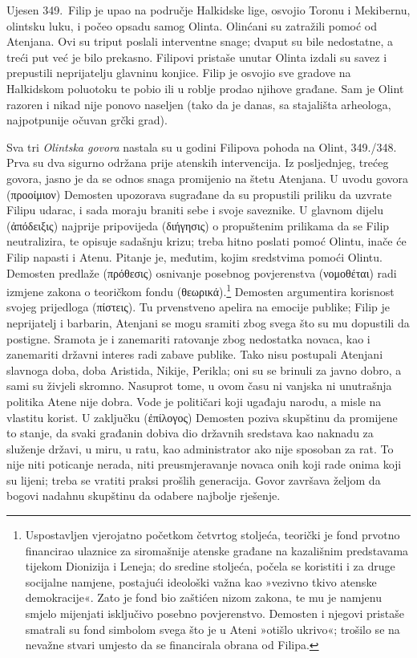 Ujesen 349.\ Filip je upao na područje Halkidske lige, osvojio Toronu i Mekibernu, olintsku luku, i počeo opsadu samog Olinta. Olinćani su zatražili pomoć od Atenjana. Ovi su triput poslali interventne snage; dvaput su bile nedostatne, a treći put već je bilo prekasno. Filipovi pristaše unutar Olinta izdali su savez i prepustili neprijatelju glavninu konjice. Filip je osvojio sve gradove na Halkidskom poluotoku te pobio ili u roblje prodao njihove građane. Sam je Olint razoren i nikad nije ponovo naseljen (tako da je danas, sa stajališta arheologa, najpotpunije očuvan grčki grad).

Sva tri \textit{Olintska govora} nastala su u godini Filipova pohoda na Olint, 349./348. Prva su dva sigurno održana prije atenskih intervencija. Iz posljednjeg, trećeg govora, jasno je da se odnos snaga promijenio na štetu Atenjana. U uvodu govora \textgreek[variant=ancient]{(προοίμιον)} Demosten upozorava sugrađane da su propustili priliku da uzvrate Filipu udarac, i sada moraju braniti sebe i svoje saveznike. U glavnom dijelu \textgreek[variant=ancient]{(ἀπόδειξις)} najprije pripovijeda  \textgreek[variant=ancient]{(διήγησις)} o propuštenim prilikama da se Filip neutralizira, te opisuje sadašnju krizu; treba hitno poslati pomoć Olintu, inače će Filip napasti i Atenu. Pitanje je, međutim, kojim sredstvima pomoći Olintu. Demosten predlaže \textgreek[variant=ancient]{(πρόθεσις)} osnivanje posebnog povjerenstva \textgreek[variant=ancient]{(νομοθέται)} radi izmjene zakona o teoričkom fondu \textgreek[variant=ancient]{(θεωρικά).}\footnote{Uspostavljen vjerojatno početkom četvrtog stoljeća, teorički je fond prvotno financirao ulaznice za siromašnije atenske građane na kazališnim predstavama tijekom Dionizija i Leneja; do sredine stoljeća, počela se koristiti i za druge socijalne namjene, postajući ideološki važna kao »vezivno tkivo atenske demokracije«. Zato je fond bio zaštićen nizom zakona, te mu je namjenu smjelo mijenjati isključivo posebno povjerenstvo. Demosten i njegovi pristaše smatrali su fond simbolom svega što je u Ateni »otišlo ukrivo«; trošilo se na nevažne stvari umjesto da se financirala obrana od Filipa.} Demosten argumentira korisnost svojeg prijedloga (πίστεις). Tu prvenstveno apelira na emocije publike; Filip je neprijatelj i barbarin, Atenjani se mogu sramiti zbog svega što su mu dopustili da postigne. Sramota je i zanemariti ratovanje zbog nedostatka novaca, kao i zanemariti državni interes radi zabave publike. Tako nisu postupali Atenjani slavnoga doba, doba Aristida, Nikije, Perikla; oni su se brinuli za javno dobro, a sami su živjeli skromno. Nasuprot tome, u ovom času ni vanjska ni unutrašnja politika Atene nije dobra. Vode je političari koji ugađaju narodu, a misle na vlastitu korist. U zaključku (ἐπίλογος) Demosten poziva skupštinu da promijene to stanje, da svaki građanin dobiva dio državnih sredstava kao naknadu za služenje državi, u miru, u ratu, kao administrator ako nije sposoban za rat. To nije niti poticanje nerada, niti preusmjeravanje novaca onih koji rade onima koji su lijeni; treba se vratiti praksi prošlih generacija. Govor završava željom da bogovi nadahnu skupštinu da odabere najbolje rješenje.

